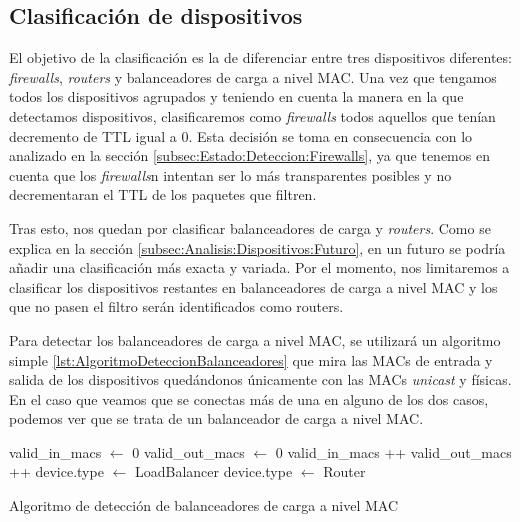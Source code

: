 \documentclass[twoside, 12pt]{epstfg}
\begin{document}
\subsection{Clasificación de dispositivos}
El objetivo de la clasificación es la de diferenciar entre tres dispositivos diferentes: \textit{firewalls}, \textit{routers} y balanceadores de carga a nivel MAC. Una vez que tengamos todos los dispositivos agrupados y teniendo en cuenta la manera en la que detectamos dispositivos, clasificaremos como \textit{firewalls} todos aquellos que tenían decremento de TTL igual a 0. Esta decisión se toma en consecuencia con lo analizado en la sección \ref{subsec:Estado:Deteccion:Firewalls}, ya que tenemos en cuenta que los \textit{firewalls}n intentan ser lo más transparentes posibles y no decrementaran el TTL de los paquetes que filtren.

Tras esto, nos quedan por clasificar balanceadores de carga y \textit{routers}. Como se explica en la sección \ref{subsec:Analisis:Dispositivos:Futuro}, en un futuro se podría añadir una clasificación más exacta y variada. Por el momento, nos limitaremos a clasificar los dispositivos restantes en balanceadores de carga a nivel MAC y los que no pasen el filtro serán identificados como routers.

Para detectar los balanceadores de carga a nivel MAC, se utilizará un algoritmo simple \ref{lst:AlgoritmoDeteccionBalanceadores} que mira las MACs de entrada y salida de los dispositivos quedándonos únicamente con las MACs \textit{unicast} y físicas. En el caso que veamos que se conectas más de una en alguno de los dos casos, podemos ver que se trata de un balanceador de carga a nivel MAC.

\begin{algorithm}[btp]
\begin{algorithmic}
\State valid\_in\_macs $\gets$ 0
\State valid\_out\_macs $\gets$ 0
            \State valid\_in\_macs ++
        \EndIf
    \EndFor
            \State valid\_out\_macs ++
        \EndIf
    \EndFor
        \State device.type $\gets$ LoadBalancer
    \Else
        \State device.type $\gets$ Router
    \EndIf
\EndFor
\EndFunction
\end{algorithmic}
\caption{Algoritmo de detección de balanceadores de carga a nivel MAC}
\label{lst:AlgoritmoDeteccionBalanceadores}
\end{algorithm}
\end{document}
